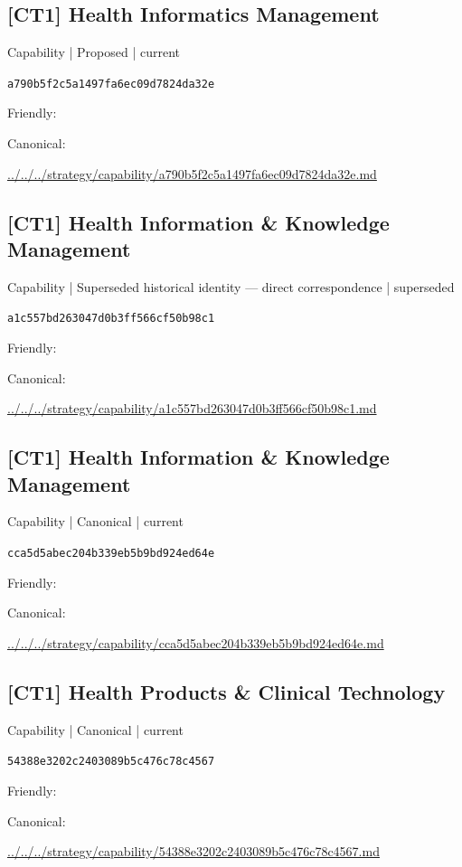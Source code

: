 \documentclass[10pt,a4paper]{article}
\begin{document}
\subsection*{[CT1] Health Informatics Management}
{\small Capability | Proposed | current}\par
\texttt{a790b5f2c5a1497fa6ec09d7824da32e}\par
Friendly: \par
Canonical: \par
{\footnotesize\url{../../../strategy/capability/a790b5f2c5a1497fa6ec09d7824da32e.md}}\par
\subsection*{[CT1] Health Information \& Knowledge Management}
{\small Capability | Superseded historical identity — direct correspondence | superseded}\par
\texttt{a1c557bd263047d0b3ff566cf50b98c1}\par
Friendly: \par
Canonical: \par
{\footnotesize\url{../../../strategy/capability/a1c557bd263047d0b3ff566cf50b98c1.md}}\par
\subsection*{[CT1] Health Information \& Knowledge Management}
{\small Capability | Canonical | current}\par
\texttt{cca5d5abec204b339eb5b9bd924ed64e}\par
Friendly: \par
Canonical: \par
{\footnotesize\url{../../../strategy/capability/cca5d5abec204b339eb5b9bd924ed64e.md}}\par
\subsection*{[CT1] Health Products \& Clinical Technology}
{\small Capability | Canonical | current}\par
\texttt{54388e3202c2403089b5c476c78c4567}\par
Friendly: \par
Canonical: \par
{\footnotesize\url{../../../strategy/capability/54388e3202c2403089b5c476c78c4567.md}}\par
\end{document}
